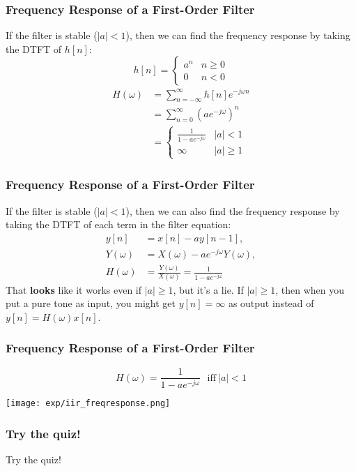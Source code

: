 \documentclass{beamer}
\begin{document}
\begin{frame}
  \frametitle{Frequency Response of a First-Order Filter}

  If the filter is stable ($|a|<1$), then 
  we can find the frequency response by taking the DTFT of $h[n]$:
  \begin{displaymath}
    h[n] = \begin{cases}a^n & n\ge 0\\
      0 &n < 0
    \end{cases}
  \end{displaymath}
  \begin{align*}
    H(\omega) &= \sum_{n=-\infty}^\infty h[n]e^{-j\omega n}\\
    &= \sum_{n=0}^\infty \left(ae^{-j\omega}\right)^n\\
    &= \begin{cases}
      \frac{1}{1-ae^{-j\omega}} & |a| < 1\\
      \infty & |a| \ge 1
    \end{cases}
  \end{align*}
\end{frame}

\begin{frame}
  \frametitle{Frequency Response of a First-Order Filter}

  If the filter is stable ($|a|<1$), then 
  we can also find the frequency response by taking the DTFT of each
  term in the filter equation:
  \begin{align*}
  y[n] &= x[n] - ay[n-1],\\
  Y(\omega) &= X(\omega)-ae^{-j\omega} Y(\omega),\\
  H(\omega) &= \frac{Y(\omega)}{X(\omega)}=\frac{1}{1-ae^{-j\omega}}
  \end{align*}
  That {\bf looks} like it works even if $|a|\ge 1$, but it's a lie.
  If $|a|\ge 1$, then when you put a pure tone as input, you might get
  $y[n]=\infty$ as output instead of $y[n]=H(\omega)x[n]$.
\end{frame}

\begin{frame}
  \frametitle{Frequency Response of a  First-Order Filter}
  \[
  H(\omega) = \frac{1}{1-ae^{-j\omega}}~~~\mbox{iff}~|a|<1
  \]
  
  \centerline{\texttt{[image: exp/iir\_freqresponse.png]}}
\end{frame}

\begin{frame}
  \frametitle{Try the quiz!}

  Try the quiz!
\end{frame}
\end{document}
